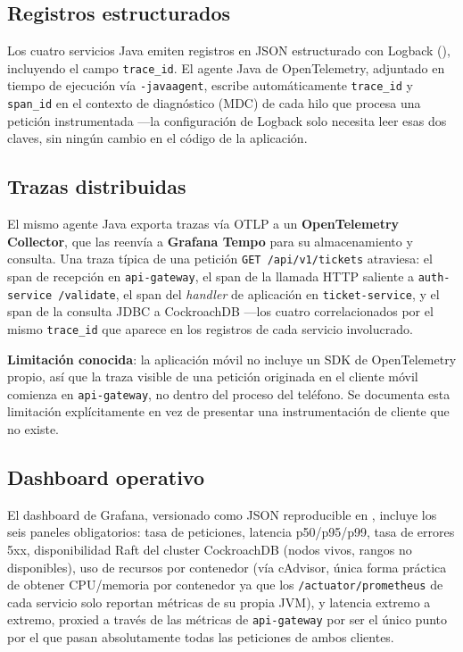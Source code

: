 \subsection{Registros estructurados}

Los cuatro servicios Java emiten registros en JSON estructurado con Logback
(\texttt{}), incluyendo el campo \texttt{trace\_id}. El agente Java de
OpenTelemetry, adjuntado en tiempo de ejecución vía \texttt{-javaagent}, escribe automáticamente
\texttt{trace\_id} y \texttt{span\_id} en el contexto de diagnóstico (MDC) de cada hilo que
procesa una petición instrumentada —la configuración de Logback solo necesita leer esas dos
claves, sin ningún cambio en el código de la aplicación.

\subsection{Trazas distribuidas}

El mismo agente Java exporta trazas vía OTLP a un \textbf{OpenTelemetry Collector}, que las
reenvía a \textbf{Grafana Tempo} para su almacenamiento y consulta. Una traza típica de una
petición \texttt{GET /api/v1/tickets} atraviesa: el span de recepción en \texttt{api-gateway}, el
span de la llamada HTTP saliente a \texttt{auth-service /validate}, el span del \emph{handler} de
aplicación en \texttt{ticket-service}, y el span de la consulta JDBC a CockroachDB —los cuatro
correlacionados por el mismo \texttt{trace\_id} que aparece en los registros de cada servicio
involucrado.

\textbf{Limitación conocida}: la aplicación móvil no incluye un SDK de OpenTelemetry propio, así
que la traza visible de una petición originada en el cliente móvil comienza en
\texttt{api-gateway}, no dentro del proceso del teléfono. Se documenta esta limitación
explícitamente en vez de presentar una instrumentación de cliente que no existe.

\subsection{Dashboard operativo}

El dashboard de Grafana, versionado como JSON reproducible en
\texttt{}, incluye los seis paneles obligatorios: tasa de
peticiones, latencia p50/p95/p99, tasa de errores 5xx, disponibilidad Raft del cluster
CockroachDB (nodos vivos, rangos no disponibles), uso de recursos por contenedor (vía cAdvisor,
única forma práctica de obtener CPU/memoria por contenedor ya que los \texttt{/actuator/prometheus}
de cada servicio solo reportan métricas de su propia JVM), y latencia extremo a extremo, proxied
a través de las métricas de \texttt{api-gateway} por ser el único punto por el que pasan
absolutamente todas las peticiones de ambos clientes.
